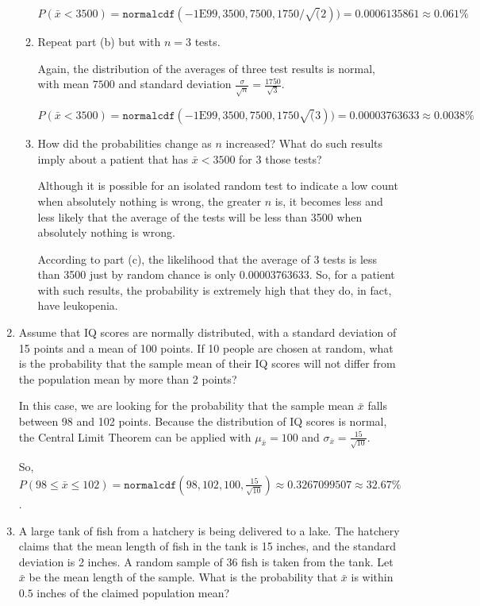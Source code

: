 \documentclass{article}
\newcommand{\answer}[1]{\color{red}#1}
\begin{document}
\begin{enumerate}
\begin{enumerate}
{	$P(\bar{x} < 3500) = \texttt{normalcdf}(-1\mbox{E}99, 3500, 7500, 1750/\sqrt(2)) = 0.0006135861 \approx 0.061\%$
	} 

	\item Repeat part (b) but with $n=3$ tests. 
	
	{\answer Again, the distribution of the averages of three test results is normal, with mean $7500$ and standard deviation $\frac{\sigma}{\sqrt{n}} = \frac{1750}{\sqrt{3}}$. 
	
	$P(\bar{x} < 3500) = \texttt{normalcdf}(-1\mbox{E}99, 3500, 7500, 1750\sqrt(3)) = 0.00003763633 \approx 0.0038\%$
	} 

	\item How did the probabilities change as $n$ increased?  What do such results imply about a patient that has $\bar x < 3500$ for 3 those tests?  
	
	{\answer Although it is possible for an isolated random test to indicate a low count when absolutely nothing is wrong, the greater $n$ is, it becomes less and less likely that the average of the tests will be less than 3500 when absolutely nothing is wrong. 
	
	According to part (c), the likelihood that the average of 3 tests is less than 3500 just by random chance is only $0.00003763633$.  So, for a patient with such results, the probability is extremely high that they do, in fact, have leukopenia.
	} 
	\end{enumerate}
	
\item Assume that IQ scores are normally distributed, with a standard deviation of 15 points and a mean of 100 points.  If 10 people are chosen at random, what is the probability that the sample mean of their IQ scores will not differ from the population mean by more than 2 points? 

{\answer In this case, we are looking for the probability that the sample mean $\bar{x}$ falls between 98 and 102 points.  Because the distribution of IQ scores is normal, the Central Limit Theorem can be applied with $\mu_{\bar{x}} = 100$ and $\sigma_{\bar{x}} =\frac{15}{\sqrt{10}}$. 

So, $P(98 \leq \bar{x} \leq 102) = \texttt{normalcdf}(98, 102, 100, \frac{15}{\sqrt{10}}) \approx 0.3267099507 \approx 32.67\%$.
} 

\item A large tank of fish from a hatchery is being delivered to a lake.  The hatchery claims that the mean length of fish in the tank is 15 inches, and the standard deviation is 2 inches.  A random sample of 36 fish is taken from the tank.  Let $\bar{x}$ be the mean length of the sample.  What is the probability that $\bar{x}$ is within $0.5$ inches of the claimed population mean? 


\end{enumerate}
\end{document}

